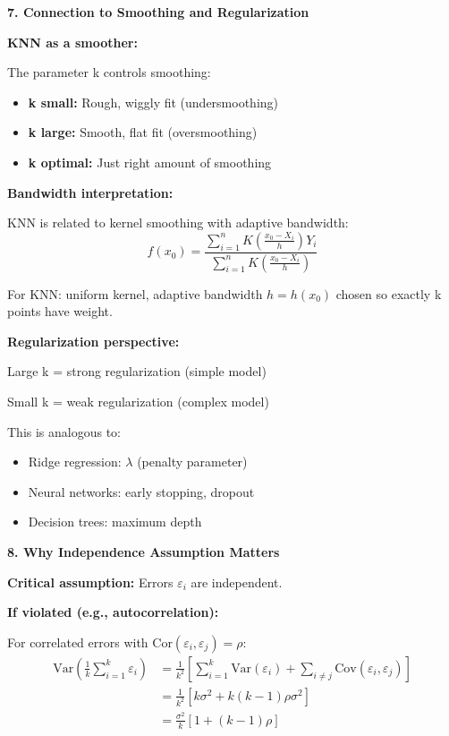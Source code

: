 \documentclass[12pt]{article}
\begin{document}
\begin{explanation}
\textbf{7. Connection to Smoothing and Regularization}

\textbf{KNN as a smoother:}

The parameter k controls smoothing:
\begin{itemize}
    \item \textbf{k small:} Rough, wiggly fit (undersmoothing)
    \item \textbf{k large:} Smooth, flat fit (oversmoothing)
    \item \textbf{k optimal:} Just right amount of smoothing
\end{itemize}

\textbf{Bandwidth interpretation:}

KNN is related to kernel smoothing with adaptive bandwidth:
\[
\hat{f}(x_0) = \frac{\sum_{i=1}^n K\left(\frac{x_0 - X_i}{h}\right) Y_i}{\sum_{i=1}^n K\left(\frac{x_0 - X_i}{h}\right)}
\]

For KNN: uniform kernel, adaptive bandwidth $h = h(x_0)$ chosen so exactly k points have weight.

\textbf{Regularization perspective:}

Large k = strong regularization (simple model)

Small k = weak regularization (complex model)

This is analogous to:
\begin{itemize}
    \item Ridge regression: $\lambda$ (penalty parameter)
    \item Neural networks: early stopping, dropout
    \item Decision trees: maximum depth
\end{itemize}

\textbf{8. Why Independence Assumption Matters}

\textbf{Critical assumption:} Errors $\varepsilon_i$ are independent.

\textbf{If violated (e.g., autocorrelation):}

For correlated errors with Cor$(\varepsilon_i, \varepsilon_j) = \rho$:
\begin{align*}
\text{Var}\left(\frac{1}{k}\sum_{i=1}^k \varepsilon_i\right) &= \frac{1}{k^2}\left[\sum_{i=1}^k \text{Var}(\varepsilon_i) + \sum_{i \neq j}\text{Cov}(\varepsilon_i, \varepsilon_j)\right] \\
&= \frac{1}{k^2}\left[k\sigma^2 + k(k-1)\rho\sigma^2\right] \\
&= \frac{\sigma^2}{k}[1 + (k-1)\rho]
\end{align*}


\end{explanation}
\end{document}
